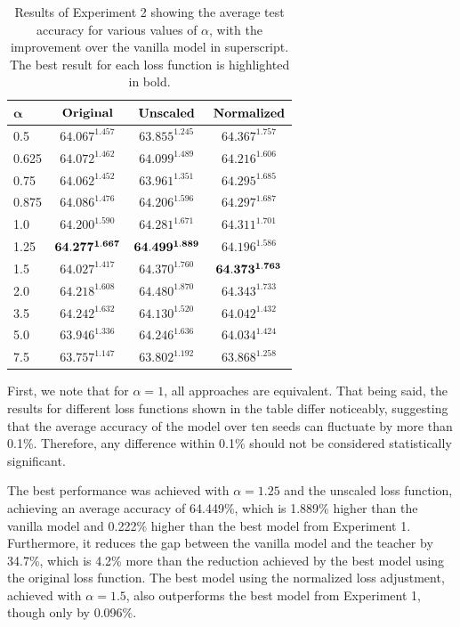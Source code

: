 \begin{table}[h]
	\centering
	\begin{tabular}{lccc}
		\toprule
		$\boldsymbol{\alpha}$ & $\bf{Original}$ & $\bf{Unscaled}$ & $\bf{Normalized}$ \\ \midrule
		0.5 & $64.067^{1.457}$ & $63.855^{1.245}$ & $64.367^{1.757}$ \\
		0.625 & $64.072^{1.462}$ & $64.099^{1.489}$ & $64.216^{1.606}$ \\
		0.75 & $64.062^{1.452}$ & $63.961^{1.351}$ & $64.295^{1.685}$ \\
		0.875 & $64.086^{1.476}$ & $64.206^{1.596}$ & $64.297^{1.687}$ \\
		1.0 & $64.200^{1.590}$ & $64.281^{1.671}$ & $64.311^{1.701}$ \\
		1.25 & $\bf{64.277^{1.667}}$ & $\bf{64.499^{1.889}}$ & $64.196^{1.586}$ \\
		1.5 & $64.027^{1.417}$ & $64.370^{1.760}$ & $\bf{64.373^{1.763}}$ \\
		2.0 & $64.218^{1.608}$ & $64.480^{1.870}$ & $64.343^{1.733}$ \\
		3.5 & $64.242^{1.632}$ & $64.130^{1.520}$ & $64.042^{1.432}$ \\
		5.0 & $63.946^{1.336}$ & $64.246^{1.636}$ & $64.034^{1.424}$ \\
		7.5 & $63.757^{1.147}$ & $63.802^{1.192}$ & $63.868^{1.258}$ \\
		\bottomrule
	\end{tabular}
	\caption{Results of Experiment 2 showing the average test accuracy for various values of $\alpha$, with the improvement over the vanilla model in superscript. The best result for each loss function is highlighted in bold.}
	\label{tab:exp2_res}
\end{table}

First, we note that for $\alpha=1$, all approaches are equivalent. That being said, the results for different loss functions shown in the table differ noticeably, suggesting that the average accuracy of the model over ten seeds can fluctuate by more than 0.1\%. Therefore, any difference within 0.1\% should not be considered statistically significant.

The best performance was achieved with $\alpha=1.25$ and the unscaled loss function, achieving an average accuracy of 64.449\%, which is 1.889\% higher than the vanilla model and 0.222\% higher than the best model from Experiment 1. Furthermore, it reduces the gap between the vanilla model and the teacher by 34.7\%, which is 4.2\% more than the reduction achieved by the best model using the original loss function. The best model using the normalized loss adjustment, achieved with $\alpha=1.5$, also outperforms the best model from Experiment 1, though only by 0.096\%.

